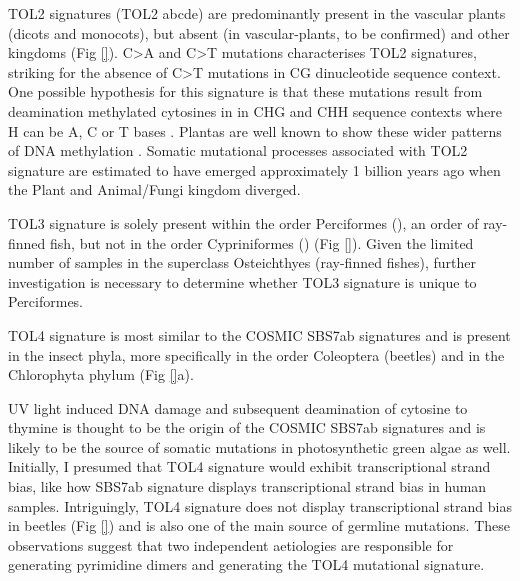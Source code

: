 %

TOL2 signatures (TOL2 abcde) are predominantly present in the vascular plants (dicots and monocots), but absent (in vascular-plants, to be confirmed) and other kingdoms (Fig \ref{}). C>A and C>T mutations characterises TOL2 signatures, striking for the absence of C>T mutations in CG dinucleotide sequence context. One possible hypothesis for this signature is that these mutations result from deamination methylated cytosines in in CHG and CHH sequence contexts where H can be A, C or T bases \cite{}. Plantas are well known to show these wider patterns of DNA methylation \cite{}. Somatic mutational processes associated with TOL2 signature are estimated to have emerged approximately 1 billion years ago when the Plant and Animal/Fungi kingdom diverged. 


TOL3 signature is solely present within the order Perciformes (), an order of ray-finned fish, but not in the order Cypriniformes () (Fig \ref{}). Given the limited number of samples in the superclass Osteichthyes (ray-finned fishes), further investigation is necessary to determine whether TOL3 signature is unique to Perciformes. 



TOL4 signature is most similar to the COSMIC SBS7ab signatures and is present in the insect phyla, more specifically in the order Coleoptera (beetles) and in the Chlorophyta phylum (Fig \ref{}a). 


UV light induced DNA damage and subsequent deamination of cytosine to thymine is thought to be the origin of the COSMIC SBS7ab signatures \cite{} and is likely to be the source of somatic mutations in photosynthetic green algae as well. Initially, I presumed that TOL4 signature would exhibit transcriptional strand bias, like how SBS7ab signature displays transcriptional strand bias in human samples. Intriguingly, TOL4 signature does not display transcriptional strand bias in beetles (Fig \ref{}) and is also one of the main source of germline mutations. These observations suggest that two independent aetiologies are responsible for generating pyrimidine dimers and generating the TOL4 mutational signature.  

